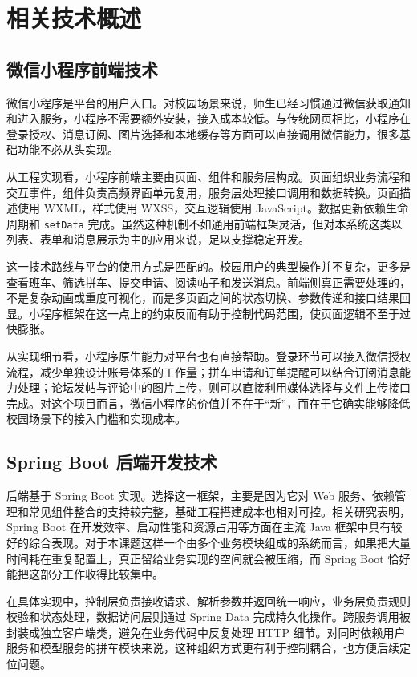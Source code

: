 ﻿\chapter{相关技术概述}\label{chap:related-work}

\section{微信小程序前端技术}

微信小程序是平台的用户入口。对校园场景来说，师生已经习惯通过微信获取通知和进入服务，小程序不需要额外安装，接入成本较低。与传统网页相比，小程序在登录授权、消息订阅、图片选择和本地缓存等方面可以直接调用微信能力，很多基础功能不必从头实现。

从工程实现看，小程序前端主要由页面、组件和服务层构成。页面组织业务流程和交互事件，组件负责高频界面单元复用，服务层处理接口调用和数据转换。页面描述使用 WXML，样式使用 WXSS，交互逻辑使用 JavaScript。数据更新依赖生命周期和 \texttt{setData} 完成。虽然这种机制不如通用前端框架灵活，但对本系统这类以列表、表单和消息展示为主的应用来说，足以支撑稳定开发。

这一技术路线与平台的使用方式是匹配的。校园用户的典型操作并不复杂，更多是查看班车、筛选拼车、提交申请、阅读帖子和发送消息。前端侧真正需要处理的，不是复杂动画或重度可视化，而是多页面之间的状态切换、参数传递和接口结果回显。小程序框架在这一点上的约束反而有助于控制代码范围，使页面逻辑不至于过快膨胀。

从实现细节看，小程序原生能力对平台也有直接帮助。登录环节可以接入微信授权流程，减少单独设计账号体系的工作量；拼车申请和订单提醒可以结合订阅消息能力处理；论坛发帖与评论中的图片上传，则可以直接利用媒体选择与文件上传接口完成。对这个项目而言，微信小程序的价值并不在于“新”，而在于它确实能够降低校园场景下的接入门槛和实现成本。

\section{Spring Boot 后端开发技术}

后端基于 Spring Boot 实现。选择这一框架，主要是因为它对 Web 服务、依赖管理和常见组件整合的支持较完整，基础工程搭建成本也相对可控。相关研究表明，Spring Boot 在开发效率、启动性能和资源占用等方面在主流 Java 框架中具有较好的综合表现\cite{jelen2021,ksiazek2022}。对于本课题这样一个由多个业务模块组成的系统而言，如果把大量时间耗在重复配置上，真正留给业务实现的空间就会被压缩，而 Spring Boot 恰好能把这部分工作收得比较集中。

在具体实现中，控制层负责接收请求、解析参数并返回统一响应，业务层负责规则校验和状态处理，数据访问层则通过 Spring Data 完成持久化操作。跨服务调用被封装成独立客户端类，避免在业务代码中反复处理 HTTP 细节。对同时依赖用户服务和模型服务的拼车模块来说，这种组织方式更有利于控制耦合，也方便后续定位问题。

